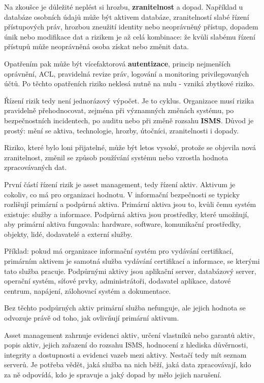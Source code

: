 \documentclass[11pt,a4paper]{article}
\begin{document}
Na zkoušce je důležité neplést si hrozbu, \textbf{zranitelnost} a dopad. Například u databáze osobních údajů může být aktivem databáze, zranitelností slabé řízení přístupových práv, hrozbou zneužití identity nebo neoprávněný přístup, dopadem únik nebo modifikace dat a rizikem je až celá kombinace: že kvůli slabému řízení přístupů může neoprávněná osoba získat nebo změnit data.

Opatřením pak může být vícefaktorová \textbf{autentizace}, princip nejmenších oprávnění, ACL, pravidelná revize práv, logování a monitoring privilegovaných účtů. Po těchto opatřeních riziko neklesá nutně na nulu - vzniká zbytkové riziko.

Řízení rizik tedy není jednorázový výpočet. Je to cyklus. Organizace musí rizika pravidelně přehodnocovat, zejména při významných změnách systému, po bezpečnostních incidentech, po auditu nebo při změně rozsahu \textbf{ISMS}. Důvod je prostý: mění se aktiva, technologie, hrozby, útočníci, zranitelnosti i dopady.

Riziko, které bylo loni přijatelné, může být letos vysoké, protože se objevila nová zranitelnost, změnil se způsob používání systému nebo vzrostla hodnota zpracovávaných dat.

První částí řízení rizik je asset management, tedy řízení aktiv. Aktivum je cokoliv, co má pro organizaci hodnotu. V informační bezpečnosti se typicky rozlišují primární a podpůrná aktiva. Primární aktiva jsou to, kvůli čemu systém existuje: služby a informace. Podpůrná aktiva jsou prostředky, které umožňují, aby primární aktiva fungovala: hardware, software, komunikační prostředky, objekty, lidé, dodavatelé a externí služby.

Příklad: pokud má organizace informační systém pro vydávání certifikací, primárním aktivem je samotná služba vydávání certifikací a informace, se kterými tato služba pracuje. Podpůrnými aktivy jsou aplikační server, databázový server, operační systém, síťové prvky, administrátoři, dodavatel aplikace, datové centrum, napájení, zálohovací systém a dokumentace.

Bez těchto podpůrných aktiv primární služba nefunguje, ale jejich hodnota se odvozuje právě od toho, jak ovlivňují primární aktivum.

Asset management zahrnuje evidenci aktiv, určení vlastníků nebo garantů aktiv, popis aktiv, jejich zařazení do rozsahu ISMS, hodnocení z hlediska důvěrnosti, integrity a dostupnosti a evidenci vazeb mezi aktivy. Nestačí tedy mít seznam serverů. Je potřeba vědět, jaká služba na nich běží, jaká data zpracovávají, kdo za ně odpovídá, kdo je spravuje a jaký dopad by mělo jejich narušení.
\end{document}
